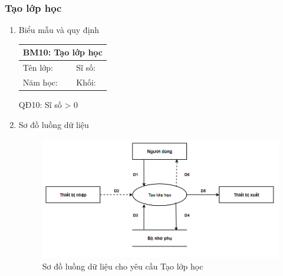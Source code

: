\documentclass[a4paper]{article}
\begin{document}
					\subsubsection{Tạo lớp học}	
					\begin{enumerate}
\item Biểu mẫu và quy định

\begin{table}[H]
\centering
\renewcommand{\arraystretch}{1.5}
\setlength{\tabcolsep}{12pt}
\begin{tabular}{|p{5cm}|p{5cm}|}
\hline
\multicolumn{2}{|c|}{\textbf{BM10: Tạo lớp học}} \\  
\hline
Tên lớp: \dotfill  & Sĩ số: \dotfill \\
\hline
Năm học: \dotfill & Khối: \dotfill \\
\hline
\end{tabular}
\end{table}

QĐ10: Sĩ số > 0

\item Sơ đồ luồng dữ liệu
\begin{figure}[H] 
    \centering
    \includegraphics[width=1\textwidth]{dfd10} %
    \caption{Sơ đồ luồng dữ liệu cho yêu cầu Tạo lớp học}
\end{figure}


\end{enumerate}
\end{document}
